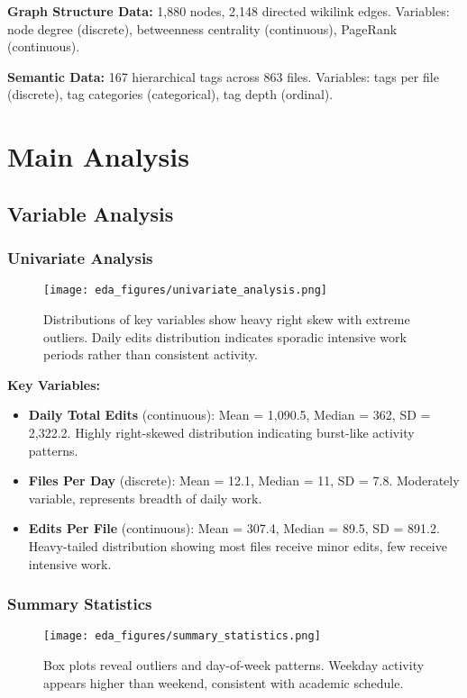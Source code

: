 \documentclass[11pt]{article}
\begin{document}
\textbf{Graph Structure Data:} 1,880 nodes, 2,148 directed wikilink edges. Variables: node degree (discrete), betweenness centrality (continuous), PageRank (continuous).

\textbf{Semantic Data:} 167 hierarchical tags across 863 files. Variables: tags per file (discrete), tag categories (categorical), tag depth (ordinal).

\section{Main Analysis}

\subsection{Variable Analysis}

\subsubsection{Univariate Analysis}

\begin{figure}[H]
\centering
\texttt{[image: eda\_figures/univariate\_analysis.png]}
\caption{Distributions of key variables show heavy right skew with extreme outliers. Daily edits distribution indicates sporadic intensive work periods rather than consistent activity.}
\end{figure}

\textbf{Key Variables:}
\begin{itemize}
    \item \textbf{Daily Total Edits} (continuous): Mean = 1,090.5, Median = 362, SD = 2,322.2. Highly right-skewed distribution indicating burst-like activity patterns.
    \item \textbf{Files Per Day} (discrete): Mean = 12.1, Median = 11, SD = 7.8. Moderately variable, represents breadth of daily work.
    \item \textbf{Edits Per File} (continuous): Mean = 307.4, Median = 89.5, SD = 891.2. Heavy-tailed distribution showing most files receive minor edits, few receive intensive work.
\end{itemize}

\subsubsection{Summary Statistics}

\begin{figure}[H]
\centering
\texttt{[image: eda\_figures/summary\_statistics.png]}
\caption{Box plots reveal outliers and day-of-week patterns. Weekday activity appears higher than weekend, consistent with academic schedule.}
\end{figure}
\end{document}
